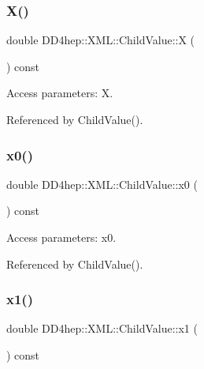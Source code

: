 \subsubsection{\texorpdfstring{X()}{X()}}
{\footnotesize\ttfamily double D\+D4hep\+::\+X\+M\+L\+::\+Child\+Value\+::X (\begin{DoxyParamCaption}{ }\end{DoxyParamCaption}) const}



Access parameters\+: X. 



Referenced by Child\+Value().

\hypertarget{struct_d_d4hep_1_1_x_m_l_1_1_child_value_a3c4c3b0852c61d5df3bca9488d0b272a}{}\label{struct_d_d4hep_1_1_x_m_l_1_1_child_value_a3c4c3b0852c61d5df3bca9488d0b272a} 
\subsubsection{\texorpdfstring{x0()}{x0()}}
{\footnotesize\ttfamily double D\+D4hep\+::\+X\+M\+L\+::\+Child\+Value\+::x0 (\begin{DoxyParamCaption}{ }\end{DoxyParamCaption}) const}



Access parameters\+: x0. 



Referenced by Child\+Value().

\hypertarget{struct_d_d4hep_1_1_x_m_l_1_1_child_value_a34d587c99dec29da2ecd0cfd9fdb3fe6}{}\label{struct_d_d4hep_1_1_x_m_l_1_1_child_value_a34d587c99dec29da2ecd0cfd9fdb3fe6} 
\subsubsection{\texorpdfstring{x1()}{x1()}}
{\footnotesize\ttfamily double D\+D4hep\+::\+X\+M\+L\+::\+Child\+Value\+::x1 (\begin{DoxyParamCaption}{ }\end{DoxyParamCaption}) const}




